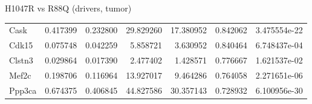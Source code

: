 \documentclass[10pt, aspectratio=169]{beamer}
\begin{document}
\begin{frame}{H1047R vs R88Q (drivers, tumor)}
\begin{tabular}{l r r r r r r}
    Cask & 0.417399 & 0.232800 & 29.829260 & 17.380952 & 0.842062 & 3.475554e-22 \\
    Cdk15 & 0.075748 & 0.042259 & 5.858721 & 3.630952 & 0.840464 & 6.748437e-04 \\
    Clstn3 & 0.029864 & 0.017390 & 2.477402 & 1.428571 & 0.776667 & 1.621537e-02 \\
    Mef2c & 0.198706 & 0.116964 & 13.927017 & 9.464286 & 0.764058 & 2.271651e-06 \\
    Ppp3ca & 0.674375 & 0.406845 & 44.827586 & 30.357143 & 0.728932 & 6.100956e-30 \\
    \bottomrule
  \end{tabular}
\end{frame}

\end{document}
